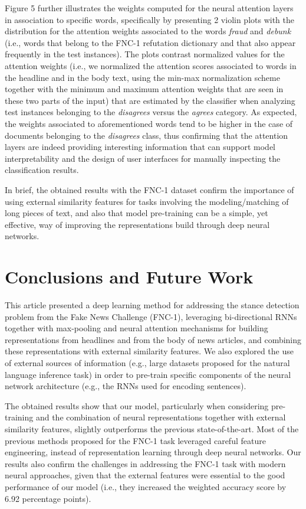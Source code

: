 Figure 5 further illustrates the weights computed for the neural attention layers in association to specific words, specifically by presenting 2 violin plots with the distribution for the attention weights associated to the words {\it fraud} and {\it debunk} (i.e., words that belong to the FNC-1 refutation dictionary and that also appear frequently in the test instances). The plots contrast normalized values for the attention weights (i.e., we normalized the attention scores associated to words in the headline and in the body text, using the min-max normalization scheme together with the minimum and maximum attention weights that are seen in these two parts of the input) that are estimated by the classifier when analyzing test instances belonging to the {\it disagrees} versus the {\it agrees} category. As expected, the weights associated to aforementioned words tend to be higher in the case of documents belonging to the {\it disagrees} class, thus confirming that the attention layers are indeed providing interesting information that can support model interpretability and the design of user interfaces for manually inspecting the classification results.

In brief, the obtained results with the FNC-1 dataset confirm the importance of using external similarity features for tasks involving the modeling/matching of long pieces of text, and also that model pre-training can be a simple, yet effective, way of improving the representations build through deep neural networks.

\section{Conclusions and Future Work}

This article presented a deep learning method for addressing the stance detection problem from the Fake News Challenge (FNC-1), leveraging bi-directional RNNs together with max-pooling and neural attention mechanisms for building representations from headlines and from the body of news articles, and combining these representations with external similarity features. We also explored the use of external sources of information (e.g., large datasets proposed for the natural language inference task) in order to pre-train specific components of the neural network architecture (e.g., the RNNs used for encoding sentences).

The obtained results show that our model, particularly when considering pre-training and the combination of neural representations together with external similarity features, slightly outperforms the previous state-of-the-art. Most of the previous methods proposed for the FNC-1 task leveraged careful feature engineering, instead of representation learning through deep neural networks. Our results also confirm the challenges in addressing the FNC-1 task with modern neural approaches, given that the external features were essential to the good performance of our model (i.e., they increased the weighted accuracy score by 6.92 percentage points).


